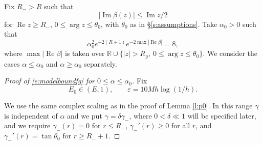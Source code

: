 \documentclass[reqno, 12pt]{amsart}
\newcommand \R {\mathbb{R}}
\newcommand \eps {\varepsilon}
\DeclareMathOperator \re {Re}
\DeclareMathOperator \im {Im}
\theoremstyle{definition}
\numberwithin{equation}{section}
\numberwithin{prop}{section}
\numberwithin{figure}{section}
\begin{document}
 Fix $R_->R$ such that 
\begin{equation}\label{e:imbeta}
|\im \beta(z)| \le \im z/2
\end{equation}
 for $\re z \ge R_-$, $0 \le \arg z \le \theta_0$, with $\theta_0$ as in \S\ref{s:assumptions}.
Take $\alpha_0 > 0$ such that 
\begin{equation}\label{e:a0f}
\alpha_0^2 e^{-2(R+1)} e^{-2\max|\re\beta|} = 8,
\end{equation}
where $\max |\re \beta|$ is taken over $\R \cup \{|z| >R_g, \ 0 \le \arg z \le \theta_0\}$. We consider the cases $\alpha \le \alpha_0$ and $\alpha \ge \alpha_0$ separately.

\begin{proof}[Proof of \eqref{e:modelboundfg} for $0 \le \alpha \le \alpha_0$] Fix 
\[E_0 \in (E,1), \qquad \eps = 10Mh\log(1/h).\]

We use the same complex scaling as in the proof of Lemma \ref{l:p0}.
In this range  $\gamma$ is independent of $\alpha$ and we put $\gamma = \delta \gamma_-$, where $0<\delta \ll 1$ will be specified later, and we require $\gamma_-(r) =0$ for $r \le R_-$, $\gamma_-'(r) \ge 0$ for all $r$, and $\gamma_-'(r) = \tan \theta_0$ for $r \ge R_-+1$.


\end{proof}
\end{document}
